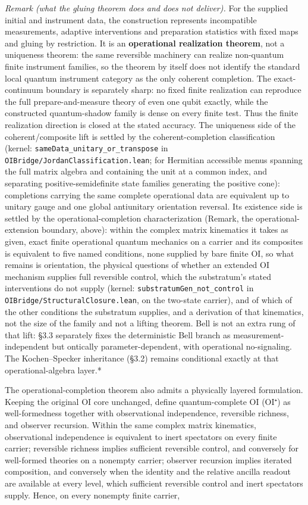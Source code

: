 \documentclass[
]{article}
\begin{document}
\emph{Remark (what the gluing theorem does and does not deliver).} For
the supplied initial and instrument data, the construction represents
incompatible measurements, adaptive interventions and preparation
statistics with fixed maps and gluing by restriction. It is an
\textbf{operational realization theorem}, not a uniqueness theorem: the
same reversible machinery can realize non-quantum finite instrument
families, so the theorem by itself does not identify the standard local
quantum instrument category as the only coherent completion. The
exact-continuum boundary is separately sharp: no fixed finite
realization can reproduce the full prepare-and-measure theory of even
one qubit exactly, while the constructed quantum-shadow family is dense
on every finite test. Thus the finite realization direction is closed at
the stated accuracy. The uniqueness side of the coherent/composite lift
is settled by the coherent-completion classification (kernel:
\texttt{sameData\_unitary\_or\_transpose} in
\texttt{OIBridge/JordanClassification.lean}; for Hermitian accessible
menus spanning the full matrix algebra and containing the unit at a
common index, and separating positive-semidefinite state families
generating the positive cone): completions carrying the same complete
operational data are equivalent up to unitary gauge and one global
antiunitary orientation reversal. Its existence side is settled by the
operational-completion characterization (Remark, the
operational-extension boundary, above): within the complex matrix
kinematics it takes as given, exact finite operational quantum mechanics
on a carrier and its composites is equivalent to five named conditions,
none supplied by bare finite OI, so what remains is orientation, the
physical questions of whether an extended OI mechanism supplies full
reversible control, which the substratum's stated interventions do not
supply (kernel: \texttt{substratumGen\_not\_control} in
\texttt{OIBridge/StructuralClosure.lean}, on the two-state carrier), and
of which of the other conditions the substratum supplies, and a
derivation of that kinematics, not the size of the family and not a
lifting theorem. Bell is not an extra rung of that lift: §3.3 separately
fixes the deterministic Bell branch as measurement-independent but
ontically parameter-dependent, with operational no-signaling. The
Kochen--Specker inheritance (§3.2) remains conditional exactly at that
operational-algebra layer.*

The operational-completion theorem also admits a physically layered
formulation. Keeping the original OI core unchanged, define
quantum-complete OI (OI⁺) as well-formedness together with observational
independence, reversible richness, and observer recursion. Within the
same complex matrix kinematics, observational independence is equivalent
to inert spectators on every finite carrier; reversible richness implies
sufficient reversible control, and conversely for well-formed theories
on a nonempty carrier; observer recursion implies iterated composition,
and conversely when the identity and the relative ancilla readout are
available at every level, which sufficient reversible control and inert
spectators supply. Hence, on every nonempty finite carrier,
\end{document}
